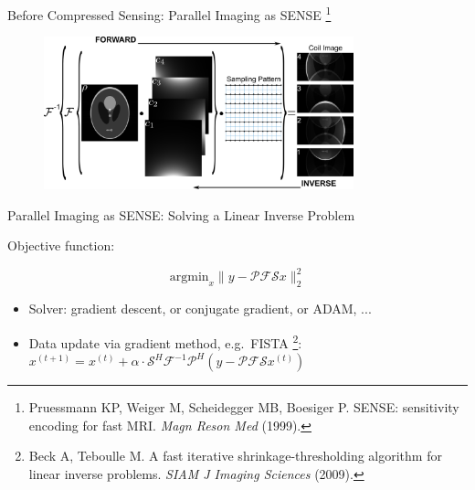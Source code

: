 \begin{frame}{Before Compressed Sensing: Parallel Imaging as SENSE \footnote{Pruessmann KP, Weiger M, Scheidegger MB, Boesiger P. SENSE: sensitivity encoding for fast MRI. \textit{Magn Reson Med} (1999).}}
	
	\begin{figure}
		\includegraphics[width=0.8\textwidth]{fig/mri-pi.png}
	\end{figure}
	
\end{frame}


\begin{frame}{Parallel Imaging as SENSE: Solving a Linear Inverse Problem}
	
	Objective function:
	
	\begin{equation}
		\mathrm{argmin}_x \lVert y -  \mathcal{P} \mathcal{F} \mathcal{S} x \rVert_2^2
	\end{equation}

	\vfill

	\begin{itemize}
		\item Solver: gradient descent, or conjugate gradient, or ADAM, ...
		\vspace{1em}
		\item Data update via gradient method, e.g.~FISTA \footnote{Beck A, Teboulle M. A fast iterative shrinkage-thresholding algorithm for linear inverse problems. \textit{SIAM J Imaging Sciences} (2009).}: \\
		\vspace{1em}
		\hspace{5em} $x^{(t+1)} = x^{(t)} + \alpha \cdot \mathcal{S}^H \mathcal{F}^{-1} \mathcal{P}^{H} (y - \mathcal{P} \mathcal{F} \mathcal{S} x^{(t)})$
	\end{itemize}

\end{frame}


